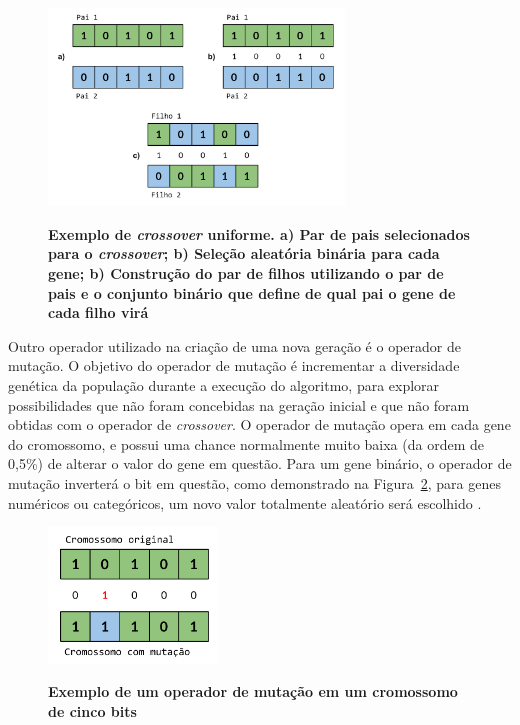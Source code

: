 \documentclass[12pt,oneside,a4paper,english,french,spanish,brazil,]{abntex2}
\begin{document}
\begin{figure}[ht]
\centering
\caption{\textbf{Exemplo de \textit{crossover} uniforme. a) Par de pais selecionados para o \textit{crossover}; b) Seleção aleatória binária para cada gene; b) Construção do par de filhos utilizando o par de pais e o conjunto binário que define de qual pai o gene de cada filho virá}}
\includegraphics[width=0.7\textwidth]{imagens/GA_Crossover_Uniforme.pdf}
\label{fig:GA_Crossover_Uniforme}
\end{figure}

Outro operador utilizado na criação de uma nova geração é o operador de mutação. O objetivo do operador de mutação é incrementar a diversidade genética da população durante a execução do algoritmo, para explorar possibilidades que não foram concebidas na geração inicial e que não foram obtidas com o operador de \textit{crossover}. O operador de mutação opera em cada gene do cromossomo, e possui uma chance normalmente muito baixa (da ordem de 0,5\%) de alterar o valor do gene em questão. Para um gene binário, o operador de mutação inverterá o bit em questão, como demonstrado na Figura~\ref{fig:GA_Mutacao}, para genes numéricos ou categóricos, um novo valor totalmente aleatório será escolhido \cite{linden:2008}.

\begin{figure}[ht]
\centering
\caption{\textbf{Exemplo de um operador de mutação em um cromossomo de cinco bits}}
\includegraphics[width=0.4\textwidth]{imagens/GA_Mutacao.pdf}
\label{fig:GA_Mutacao}
\end{figure}
\end{document}
